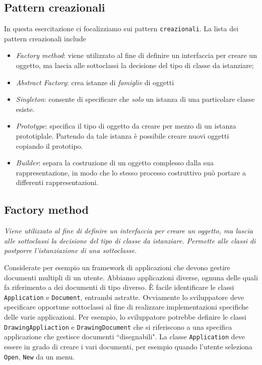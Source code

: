 \documentclass{article}
\begin{document}
\subsection{Pattern creazionali}

In questa esercitazione ci focalizziamo sui pattern \texttt{creazionali}. La lista dei pattern creazionali include
\begin{itemize}
\item \emph{Factory method}: viene utilizzato al fine di definire un interfaccia per creare un oggetto, ma lascia alle sottoclassi la decisione del tipo di classe da istanziare;
\item \emph{Abstract Factory}: crea istanze di \emph{famiglie} di oggetti
\item \emph{Singleton}: consente di specificare che \emph{solo} un istanza di una particolare classe esiste.
\item \emph{Prototype}: specifica il tipo di oggetto da creare per mezzo di un istanza prototiplale. Partendo da tale istanza \`e possibile creare nuovi oggetti copiando il prototipo.
\item \emph{Builder}: separa la costruzione di un oggetto complesso dalla sua rappresentazione, in modo che lo stesso processo costruttivo pu\`o portare a differenti rappresentazioni.
\end{itemize}






\subsection{Factory method}
\begin{framed}
\emph{Viene utilizzato al fine di definire un interfaccia per creare un oggetto, ma lascia alle sottoclassi la decisione del tipo di classe da istanziare. Permette alle classi di postporre l'istanziazione di una sottoclasse.}
\end{framed}


Considerate per esempio un framework di applicazioni che devono gestire documenti multipli di un utente. Abbiamo applicazioni diverse, ognuna delle quali fa riferimento a dei documenti di tipo diverso. \`E facile identificare le classi \texttt{Application} e \texttt{Document}, entrambi astratte. Ovviamente lo sviluppatore deve specificare opportune sottoclassi al fine di realizzare implementazioni specifiche delle varie applicazioni. Per esempio, lo sviluppatore potrebbe definire le classi \texttt{DrawingAppliaction} e \texttt{DrawingDocument} che si riferiscono a una specifica applicazione che gestisce documenti ``disegnabili". La classe \texttt{Application} deve essere in grado di creare i vari documenti, per esempio quando l'utente seleziona \texttt{Open}, \texttt{New} da un menu.
\end{document}
